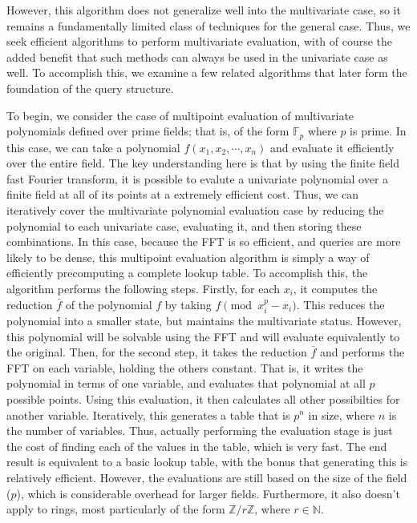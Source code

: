 \documentclass[pageno]{jpaper}
\begin{document}
However, this algorithm does not generalize well into the multivariate case, so it remains a fundamentally limited class of techniques for the general case.
Thus, we seek efficient algorithms to perform multivariate evaluation, with of course the added benefit that such methods can always be used in the univariate case as well.
To accomplish this, we examine a few related algorithms that later form the foundation of the query structure.

To begin, we consider the case of multipoint evaluation of multivariate polynomials defined over prime fields; that is, of the form $\mathbb{F}_p$ where $p$ is prime.
In this case, we can take a polynomial $f(x_1, x_2, \cdots, x_n)$ and evaluate it efficiently over the entire field.
The key understanding here is that by using the finite field fast Fourier transform, it is possible to evalute a univariate polynomial over a finite field at all of its points at a extremely efficient cost.
Thus, we can iteratively cover the multivariate polynomial evaluation case by reducing the polynomial to each univariate case, evaluating it, and then storing these combinations.
In this case, because the FFT is so efficient, and queries are more likely to be dense, this multipoint evaluation algorithm is simply a way of efficiently precomputing a complete lookup table.
To accomplish this, the algorithm performs the following steps.
Firstly, for each $x_i$, it computes the reduction $\bar{f}$ of the polynomial $f$ by taking $f\pmod{x_i^p - x_i}$.
This reduces the polynomial into a smaller state, but maintains the multivariate status.
However, this polynomial will be solvable using the FFT and will evaluate equivalently to the original.
Then, for the second step, it takes the reduction $\bar{f}$ and performs the FFT on each variable, holding the others constant.
That is, it writes the polynomial in terms of one variable, and evaluates that polynomial at all $p$ possible points.
Using this evaluation, it then calculates all other possibilties for another variable.
Iteratively, this generates a table that is $p^n$ in size, where $n$ is the number of variables.
Thus, actually performing the evaluation stage is just the cost of finding each of the values in the table, which is very fast.
The end result is equivalent to a basic lookup table, with the bonus that generating this is relatively efficient.
However, the evaluations are still based on the size of the field ($p$), which is considerable overhead for larger fields.
Furthermore, it also doesn't apply to rings, most particularly of the form $\mathbb{Z}/r\mathbb{Z}$, where $r \in \mathbb{N}$.
\end{document}
